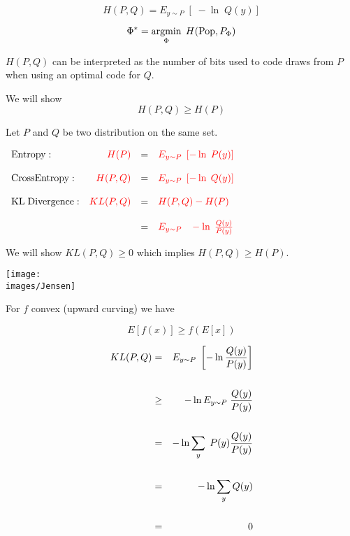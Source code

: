 {{\color{red} $$H(P,Q) = E_{y \sim P}\;\left[ \;-\ln \;Q(y)\right]$$}

{\color{red} $$\Phi^* = \operatorname*{argmin}_\Phi \;H(\mathrm{Pop},P_\Phi)$$}

\vfill
{\color{red} $H(P,Q)$} can be interpreted as the number of bits used to code draws from $P$ when using an optimal code for $Q$.

\vfill We will show
$$H(P,Q) \geq H(P)$$


Let $P$ and $Q$ be two distribution on the same set.

\vfill
\centerline{
  $\begin{array}{lrcl}
\mathrm{Entropy}: & {\color{red} H(P)} & = & {\color{red} E_{y \sim P}\;\left[-\ln\;P(y)\right]} \\
\\
\mathrm{Cross Entropy:} & {\color{red} H(P,Q)} & = & {\color{red} E_{y \sim P}\;\left[-\ln\;Q(y)\right]} \\
\\
\mathrm{KL\; Divergence:} & {\color{red} KL(P,Q)} & = & {\color{red} H(P,Q) - H(P)} \\
\\
& & = & {\color{red} E_{y \sim P}\;\;\; - \ln\;\frac{Q(y)}{P(y)}}
\end{array}$}

\vfill
We will show $KL(P,Q) \geq 0$ which implies $H(P,Q) \geq H(P)$.


\centerline{\texttt{[image: \\images/Jensen]}}

\vfill
For $f$ convex (upward curving) we have

\vfill
$$E[f(x)] \geq f(E[x])$$


\begin{eqnarray*}
  KL(P,Q) & = & E_{y \sim P}\;\left[- \ln \frac{Q(y)}{P(y)}\right] \\
  \\
  & \geq & - \ln E_{y\sim P}\;\frac{Q(y)}{P(y)} \\
  \\
  & = & - \ln \sum_y\; P(y) \frac{Q(y)}{P(y)}  \\
  \\
  & = & - \ln \sum_y Q(y) \\
  \\
  & = & 0
\end{eqnarray*}



}

